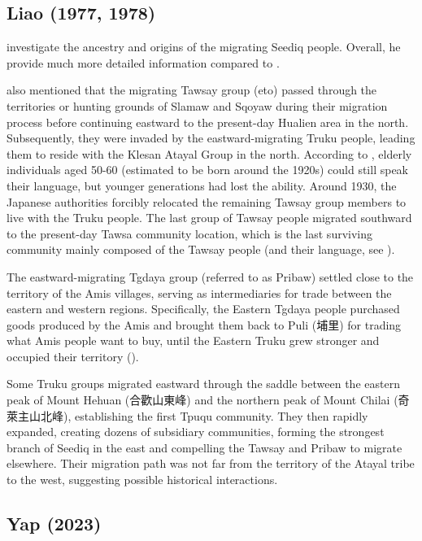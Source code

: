 \subsection{Liao (1977, 1978)}

\textcite{liao1977Sedtheruy,liao1978Sedtheruy} investigate the ancestry and origins of the migrating Seediq people. Overall, he provide much more detailed information compared to \textcite{utsurikawaetal1935}.

\textcite{liao1977Sedtheruy} also mentioned that the migrating Tawsay group (\acl{eto}) passed through the territories or hunting grounds of Slamaw and Sqoyaw during their migration process before continuing eastward to the present-day Hualien area in the north. Subsequently, they were invaded by the eastward-migrating Truku people, leading them to reside with the Klesan Atayal Group in the north. According to \textcite[65]{liao1977Sedtheruy}, elderly individuals aged 50-60 (estimated to be born around the 1920s) could still speak their language, but younger generations had lost the ability. Around 1930, the Japanese authorities forcibly relocated the remaining Tawsay group members to live with the Truku people. The last group of Tawsay people migrated southward to the present-day Tawsa community location, which is the last surviving community mainly composed of the Tawsay people (and their language, see \cite{lee2015tawsa}).

The eastward-migrating Tgdaya group (referred to as Pribaw) settled close to the territory of the Amis villages, serving as intermediaries for trade between the eastern and western regions. Specifically, the Eastern Tgdaya people purchased goods produced by the Amis and brought them back to Puli (埔里) for trading what Amis people want to buy, until the Eastern Truku grew stronger and occupied their territory (\cite[70]{liao1977Sedtheruy}).

Some Truku groups migrated eastward through the saddle between the eastern peak of Mount Hehuan (合歡山東峰) and the northern peak of Mount Chilai (奇萊主山北峰), establishing the first Tpuqu community. They then rapidly expanded, creating dozens of subsidiary communities, forming the strongest branch of Seediq in the east and compelling the Tawsay and Pribaw to migrate elsewhere. Their migration path was not far from the territory of the Atayal tribe to the west, suggesting possible historical interactions.

\subsection{Yap (2023)}

